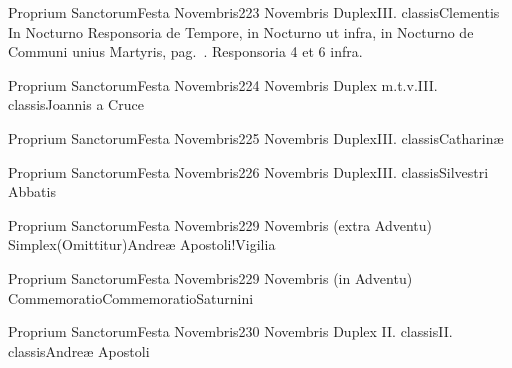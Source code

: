 \documentclass[liber-responsorialis_sanctorale.tex]{subfiles}
\begin{document}
	{Proprium Sanctorum}{Festa Novembris}{2}{23 Novembris}
	{Duplex}{III. classis}{Clementis}
	{In  Nocturno Responsoria de Tempore, in  Nocturno ut infra, in  Nocturno de Communi unius Martyris, pag.\ \pageref{M-UMEX}.}
	{Responsoria 4 et 6 infra.}

	{Proprium Sanctorum}{Festa Novembris}{2}{24 Novembris}
	{Duplex m.t.v.}{III. classis}{Joannis a Cruce}
	{\conprubric}
	{\respdetemp}

	{Proprium Sanctorum}{Festa Novembris}{2}{25 Novembris}
	{Duplex}{III. classis}{Catharinæ}
	{\vmrubric}
	{\respdetemp}

	{Proprium Sanctorum}{Festa Novembris}{2}{26 Novembris}
	{Duplex}{III. classis}{Silvestri Abbatis}
	{\conprubric}
	{\respdetemp}

	{Proprium Sanctorum}{Festa Novembris}{2}{29 Novembris (extra Adventu)}
	{Simplex}{(Omittitur)}{Andreæ Apostoli!Vigilia}
	{}
	{}
\rubric{\respdetemp}

	{Proprium Sanctorum}{Festa Novembris}{2}{29 Novembris (in Adventu)}
	{Commemoratio}{Commemoratio}{Saturnini}
	{}
	{}
\rubric{\respdetemp}

	{Proprium Sanctorum}{Festa Novembris}{2}{30 Novembris}
	{Duplex II. classis}{II. classis}{Andreæ Apostoli}
	{}
	{}

\end{document}

